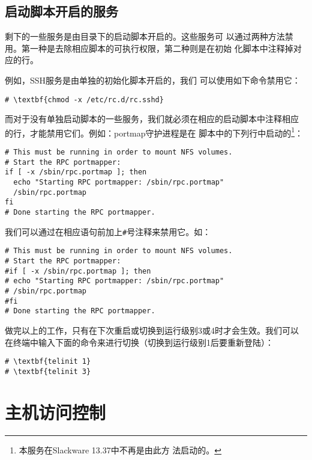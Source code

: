 \subsection{启动脚本开启的服务}
\label{chap:security:disablingServices:init}
剩下的一些服务是由目录下的启动脚本开启的。这些服务可
以通过两种方法禁用。第一种是去除相应脚本的可执行权限，第二种则是在初始
化脚本中注释掉对应的行。

例如，SSH服务是由单独的初始化脚本开启的，我们
可以使用如下命令禁用它：
\begin{Verbatim}[frame=single, commandchars=\\\{\}]
# \textbf{chmod -x /etc/rc.d/rc.sshd}
\end{Verbatim}

而对于没有单独启动脚本的一些服务，我们就必须在相应的启动脚本中注释相应
的行，才能禁用它们。例如：portmap守护进程是在
脚本中的下列行中启动的\footnote{本服务在Slackware 13.37中不再是由此方
  法启动的。}：
\begin{Verbatim}[frame=single, commandchars=\\\{\}]
# This must be running in order to mount NFS volumes.
# Start the RPC portmapper:
if [ -x /sbin/rpc.portmap ]; then
  echo "Starting RPC portmapper: /sbin/rpc.portmap"
  /sbin/rpc.portmap
fi
# Done starting the RPC portmapper.
\end{Verbatim}
我们可以通过在相应语句前加上\texttt{\#}号注释来禁用它。如：
\begin{Verbatim}[frame=single, commandchars=\\\{\}]
# This must be running in order to mount NFS volumes.
# Start the RPC portmapper:
#if [ -x /sbin/rpc.portmap ]; then
# echo "Starting RPC portmapper: /sbin/rpc.portmap"
# /sbin/rpc.portmap
#fi
# Done starting the RPC portmapper.
\end{Verbatim}

做完以上的工作，只有在下次重启或切换到运行级别3或4时才会生效。我们可以
在终端中输入下面的命令来进行切换（切换到运行级别1后要重新登陆）：
\begin{Verbatim}[frame=single, commandchars=\\\{\}]
# \textbf{telinit 1}
# \textbf{telinit 3}
\end{Verbatim}


\section{主机访问控制}
\label{chap:security:hostAccessControl}

